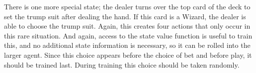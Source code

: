 \documentclass[10pt]{article} %
\begin{document}
There is one more special state; the dealer turns over the top card of the deck to set the trump suit after dealing the hand. If this card is a Wizard, the dealer is able to choose the trump suit. Again, this creates four actions that only occur in this rare situation. And again, access to the state value function is useful to train this, and no additional state information is necessary, so it can be rolled into the larger agent. Since this choice appears before the choice of bet and before play, it should be trained last. During training this choice should be taken randomly.
\end{document}
